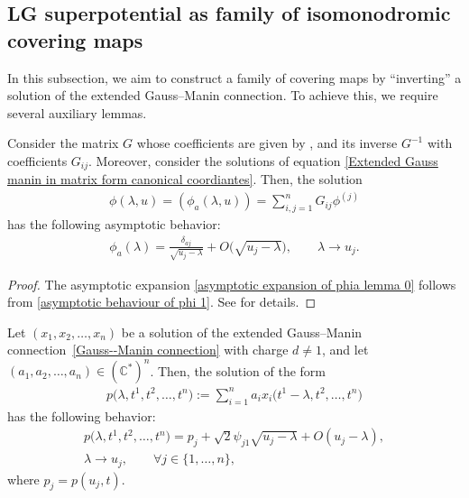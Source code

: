 \subsection{LG superpotential as family of isomonodromic covering maps}

In this subsection, we aim to construct a family of covering maps by ``inverting'' a solution of the extended Gauss--Manin connection. To achieve this, we require several auxiliary lemmas.

\begin{Lemma}
Consider the matrix \( G \) whose coefficients are given by
,
and its inverse \( G^{-1} \) with coefficients \( G_{ij} \). Moreover, consider the solutions  of equation \eqref{Extended Gauss manin in matrix form canonical coordiantes}. Then, the solution
\begin{gather}\label{phi solution normalized by Gij}
\phi(\lambda,u) = (\phi_a(\lambda,u)) = \sum_{i,j=1}^{n} G_{ij} \phi^{(j)}
\end{gather}
has the following asymptotic behavior:
\begin{gather}\label{asymptotic expansion of phia lemma 0}
 \phi_{a}(\lambda) = \frac{\delta_{aj}}{\sqrt{u_j - \lambda}} + O\bigl(\sqrt{u_j - \lambda}\bigr), \qquad \lambda \to u_j.
\end{gather}

\begin{proof}
The asymptotic expansion \eqref{asymptotic expansion of phia lemma 0} follows from \eqref{asymptotic behaviour of phi 1}. See \cite[Lemma 5.7]{B.Dubrovin3} for details.
\end{proof}
\end{Lemma}


\begin{Lemma}\label{lemma primitive form}
Let \( (x_1, x_2, \dots, x_n) \) be a solution of the extended Gauss--Manin connection~\eqref{Gauss--Manin connection} with charge \( d \neq 1 \), and let \( (a_1, a_2, \dots, a_n) \in (\mathbb{C}^{*})^n \). Then, the solution of the form
\begin{gather}\label{primitive of volume form}
p\bigl(\lambda, t^1, t^2, \dots, t^n\bigr) := \sum_{i=1}^n a_i x_i\bigl(t^1 - \lambda, t^2, \dots, t^n\bigr)
\end{gather}
has the following behavior:
\begin{gather}
p\bigl(\lambda, t^1, t^2, \dots, t^n\bigr) = p_j + \sqrt{2} \psi_{j1} \sqrt{u_j - \lambda} + O(u_j - \lambda), \nonumber\\
 \lambda \to u_j, \qquad
 \forall j \in \{1, \dots, n\},\label{asymptotic behaviour at the branch locus of p}
\end{gather}
where \( p_j = p(u_j, t) \).
\end{Lemma}

